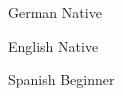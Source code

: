 













German \hfill Native
\smallskip

English \hfill Native
\smallskip

Spanish \hfill Beginner
\medskip

